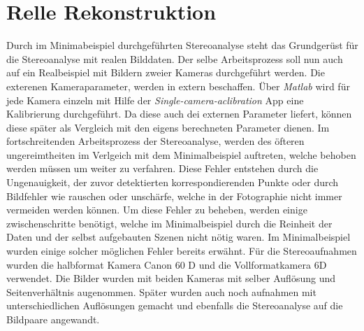 \chapter{Relle Rekonstruktion}
\label{sec:real} 

Durch im Minimabeispiel durchgeführten Stereoanalyse steht das Grundgerüst für die Stereoanalyse mit realen Bilddaten. Der selbe Arbeitsprozess soll nun auch auf ein Realbeispiel mit Bildern zweier Kameras durchgeführt werden. Die exterenen Kameraparameter, werden in extern beschaffen. Über \textit{Matlab} wird für jede Kamera einzeln mit Hilfe der \textit{Single-camera-aclibration} App eine Kalibrierung durchgeführt. Da diese auch dei externen Parameter liefert, können diese später als Vergleich mit den eigens berechneten Parameter dienen. Im fortschreitenden Arbeitsprozess der Stereoanalyse, werden des öfteren ungereimtheiten im Verlgeich mit dem Minimalbeispiel auftreten, welche behoben werden müssen um weiter zu verfahren. Diese Fehler entstehen durch die Ungenauigkeit, der zuvor detektierten korrespondierenden Punkte oder durch Bildfehler wie rauschen oder unschärfe, welche in der Fotographie nicht immer vermeiden werden können. Um diese Fehler zu beheben, werden einige zwischenschritte benötigt, welche im Minimalbeispiel durch die Reinheit der Daten und der selbst aufgebauten Szenen nicht nötig waren. Im Minimalbeispiel wurden einige solcher möglichen Fehler bereits erwähnt. Für die Stereoaufnahmen wurden die halbformat Kamera Canon 60 D und die Vollformatkamera 6D verwendet. Die Bilder wurden mit beiden Kameras mit selber Auflösung und Seitenverhältnis augenommen. Später wurden auch noch aufnahmen mit unterschiedlichen Auflösungen gemacht und ebenfalls die Stereoanalyse auf die Bildpaare angewandt.  \\

